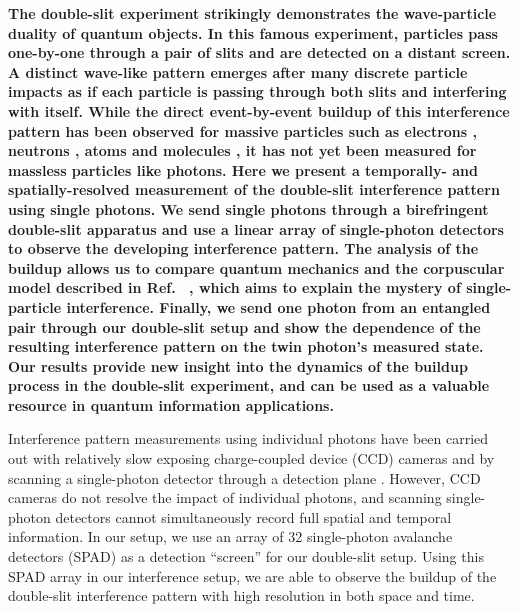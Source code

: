 \documentclass[prl,reprint,twocolumn,amsmath,preprintnumbers,amssymb,superscriptaddress]{revtex4-1}
\begin{document}
\maketitle
\textbf{The double-slit experiment strikingly demonstrates the wave-particle duality of  quantum objects. In this famous experiment, particles pass one-by-one through a pair of slits and are detected on a distant screen. A distinct wave-like pattern emerges after many discrete particle impacts as if each particle is passing through both slits and interfering with itself. While the direct event-by-event buildup of this interference pattern has been observed for massive particles such as electrons \cite{Tonomura1989, Frabboni2011,Bach2013}, neutrons \cite{Zeilinger1988}, atoms \cite{Carnal1991} and molecules \cite{Arndt1999, Brezger2002}, it has not yet been measured for massless particles like photons. Here we present a temporally- and spatially-resolved measurement of the double-slit interference pattern using single photons.  We send single photons through a birefringent double-slit apparatus and use a linear array of single-photon detectors to observe the developing interference pattern. The analysis of the buildup allows us to compare quantum mechanics and the corpuscular model described in Ref.~ \cite{Jin2010a}, which aims to explain the mystery of single-particle interference. Finally, we send one photon from an entangled pair through our double-slit setup and show the dependence of the resulting interference pattern on the twin photon's measured state. Our results provide new insight into the dynamics of the buildup process in the double-slit experiment, and can be used as a valuable resource in quantum information applications.
}

Interference pattern measurements using individual photons have been carried out with relatively slow exposing charge-coupled device (CCD) cameras \cite{Garcia2002,Jacques2005,Fickler2012} and by scanning a single-photon detector through a detection plane \cite{Zeilinger2005a}. However, CCD cameras do not resolve the impact of individual photons, and scanning single-photon detectors cannot simultaneously record full spatial and temporal information. In our setup, we use an array of 32 single-photon avalanche detectors (SPAD) \cite{Guerrieri2010a,Tisa2007} as a detection ``screen'' for our double-slit setup. Using this SPAD array in our interference setup, we are able to observe the buildup of the double-slit interference pattern with high resolution in both space and time.
 
\end{document}
